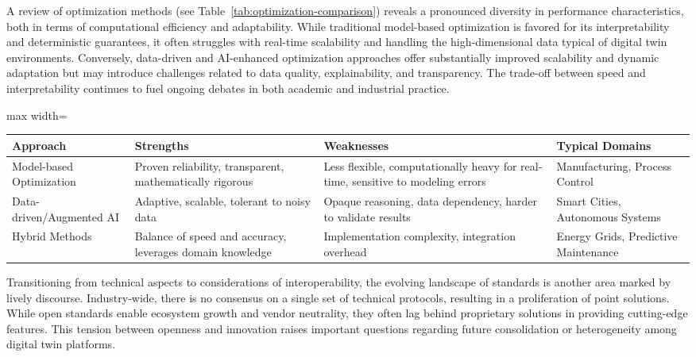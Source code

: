 \documentclass[sigconf]{acmart}
\begin{document}
A review of optimization methods (see Table~\ref{tab:optimization-comparison}) reveals a pronounced diversity in performance characteristics, both in terms of computational efficiency and adaptability. While traditional model-based optimization is favored for its interpretability and deterministic guarantees, it often struggles with real-time scalability and handling the high-dimensional data typical of digital twin environments. Conversely, data-driven and AI-enhanced optimization approaches offer substantially improved scalability and dynamic adaptation but may introduce challenges related to data quality, explainability, and transparency. The trade-off between speed and interpretability continues to fuel ongoing debates in both academic and industrial practice.

\begin{table*}[htbp]
\centering
\caption{Comparative Summary of Optimization Approaches in AI-enabled Digital Twins}
\label{tab:optimization-comparison}
\begin{adjustbox}{max width=\textwidth}
\begin{tabular}{@{}llll@{}}
\toprule
Approach & Strengths & Weaknesses & Typical Domains \\
\midrule
Model-based Optimization & Proven reliability, transparent, mathematically rigorous & Less flexible, computationally heavy for real-time, sensitive to modeling errors & Manufacturing, Process Control \\
Data-driven/Augmented AI & Adaptive, scalable, tolerant to noisy data & Opaque reasoning, data dependency, harder to validate results & Smart Cities, Autonomous Systems \\
Hybrid Methods & Balance of speed and accuracy, leverages domain knowledge & Implementation complexity, integration overhead & Energy Grids, Predictive Maintenance \\
\bottomrule
\end{tabular}
\end{adjustbox}
\end{table*}

Transitioning from technical aspects to considerations of interoperability, the evolving landscape of standards is another area marked by lively discourse. Industry-wide, there is no consensus on a single set of technical protocols, resulting in a proliferation of point solutions. While open standards enable ecosystem growth and vendor neutrality, they often lag behind proprietary solutions in providing cutting-edge features. This tension between openness and innovation raises important questions regarding future consolidation or heterogeneity among digital twin platforms.
\end{document}
